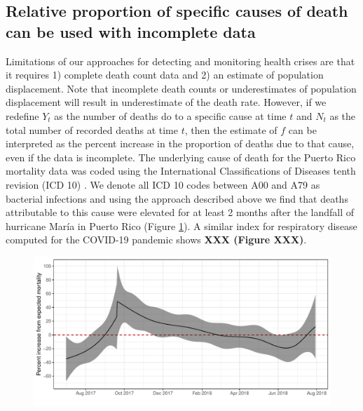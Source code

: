 \documentclass[11pt]{article}
\begin{document}

\subsection{Relative proportion of specific causes of death can be used with incomplete data}
\label{subsec:causes-deaths}
Limitations of our approaches for detecting and monitoring health crises are that it requires 1) complete death count data and 2) an estimate of population displacement. Note that incomplete death counts or underestimates of population displacement will result in underestimate of the death rate. However, if we redefine $Y_t$ as the number of deaths do to a specific cause at time $t$ and $N_t$ as the total number of recorded deaths at time $t$, then the estimate of $f$ can be interpreted as the percent increase in the proportion of deaths due to that cause, even if the data is incomplete. The underlying cause of death for the Puerto Rico mortality data was coded using the International Classifications of Diseases tenth revision (ICD 10) \cite{world2004icd}. We denote all ICD 10 codes between A00 and A79 as bacterial infections and using the approach described above we find that deaths attributable to this cause were elevated for at least 2 months after the landfall of hurricane Mar\'ia in Puerto Rico (Figure \ref{fig:fhat-bacteria}). A similar index for respiratory disease computed for the COVID-19 pandemic shows \textbf{XXX (Figure XXX)}.

\begin{figure}[ht]
	\centering	
		\includegraphics[width=1\linewidth]{figs/figure-4.pdf} 
	\caption{}
	\label{fig:fhat-bacteria}
\end{figure}
\end{document}
